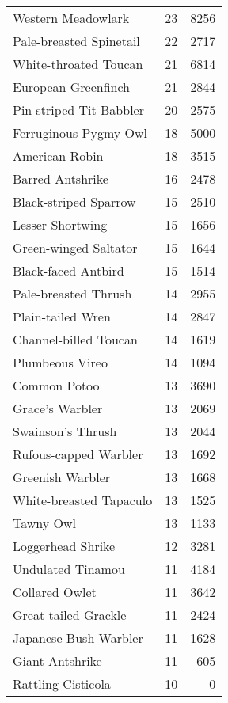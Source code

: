 \begin{longtable}{l r r}
Western Meadowlark              &23   &8256  \\
Pale-breasted Spinetail         &22   &2717  \\
White-throated Toucan           &21   &6814  \\
European Greenfinch             &21   &2844  \\
Pin-striped Tit-Babbler         &20   &2575  \\
Ferruginous Pygmy Owl           &18   &5000  \\
American Robin                  &18   &3515  \\
Barred Antshrike                &16   &2478  \\
Black-striped Sparrow           &15   &2510  \\
Lesser Shortwing                &15   &1656  \\
Green-winged Saltator           &15   &1644  \\
Black-faced Antbird             &15   &1514  \\
Pale-breasted Thrush            &14   &2955  \\
Plain-tailed Wren               &14   &2847  \\
Channel-billed Toucan           &14   &1619  \\
Plumbeous Vireo                 &14   &1094  \\
Common Potoo                    &13   &3690  \\
Grace's Warbler                 &13   &2069  \\
Swainson's Thrush               &13   &2044  \\
Rufous-capped Warbler           &13   &1692  \\
Greenish Warbler                &13   &1668  \\
White-breasted Tapaculo         &13   &1525  \\
Tawny Owl                       &13   &1133  \\
Loggerhead Shrike               &12   &3281  \\
Undulated Tinamou               &11   &4184  \\
Collared Owlet                  &11   &3642  \\
Great-tailed Grackle            &11   &2424  \\
Japanese Bush Warbler           &11   &1628  \\
Giant Antshrike                 &11   &605   \\
Rattling Cisticola              &10   &0     \\

\end{longtable}
